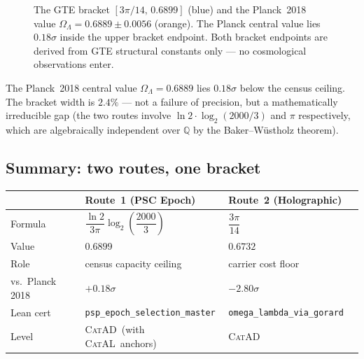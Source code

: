 \documentclass[11pt,a4paper]{article}
\newcommand{\lean}[1]{\texttt{#1}}
\newcommand{\OmL}{\Omega_\Lambda}
\newcommand{\CatAL}{\textsc{CatAL}}
\newcommand{\CatAD}{\textsc{CatAD}}
\begin{document}
\begin{figure}[ht]
\caption{The GTE bracket $[3\pi/14,\,0.6899]$ (blue) and the Planck~2018 value
$\Omega_\Lambda = 0.6889 \pm 0.0056$ (orange).  The Planck central value lies
$0.18\sigma$ inside the upper bracket endpoint.  Both bracket endpoints are
derived from GTE structural constants only --- no cosmological observations
enter.}
\label{fig:bracket}
\end{figure}

The Planck~2018 central value $\OmL = 0.6889$ lies $0.18\sigma$ below the
census ceiling.  The bracket width is $2.4\%$ --- not a failure of precision,
but a mathematically irreducible gap (the two routes involve
$\ln 2 \cdot \log_2(2000/3)$ and $\pi$ respectively, which are algebraically
independent over $\mathbb{Q}$ by the Baker--W\"{u}stholz theorem).

\subsection{Summary: two routes, one bracket}

\begin{center}
\begin{tabular}{@{}llll@{}}
\toprule
 & \textbf{Route~1 (PSC Epoch)} & \textbf{Route~2 (Holographic)}\\
\midrule
Formula & $\dfrac{\ln 2}{3\pi}\log_2\!\left(\dfrac{2000}{3}\right)$
         & $\dfrac{3\pi}{14}$ \\[8pt]
Value & $0.6899$ & $0.6732$\\
Role & census capacity ceiling & carrier cost floor\\
vs.\ Planck 2018 & $+0.18\sigma$ & $-2.80\sigma$\\
Lean cert & \lean{psp\_epoch\_selection\_master} & \lean{omega\_lambda\_via\_gorard}\\
Level & \CatAD\ (with \CatAL\ anchors) & \CatAD\\
\bottomrule
\end{tabular}
\end{center}
\end{document}
